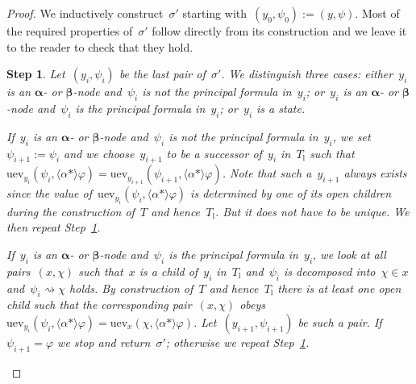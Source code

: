 \documentclass{entcs}
\newtheorem{stp}{Step}
\newenvironment{step}{\vspace{-\lastskip}\par \addvspace{.6pc
    plus .2pc minus .1pc}\begin{stp}\rm}{\end{stp}\par\addvspace{.6pc
    plus .2pc minus .1pc}}
\newcommand{\pea}[2]{\langle#1\rangle #2}
\newcommand{\prp}[1]{#1*}
\newcommand{\pzz}{\mathrel{\rightsquigarrow}}
\newcommand{\tuev}{\mathrm{uev}}
\newcommand{\talpha}{\boldsymbol{\alpha}}
\newcommand{\tbeta}{\boldsymbol{\beta}}
\newcommand{\tl}{T_{\mathrm{l}}}
\newcommand{\fchn}{\sigma}
\begin{document}
\begin{proof}
  We inductively construct~$\fchn'$ starting with~$(y_0, \psi_0) := (y, \psi)$.
  Most of the required properties of~$\fchn'$ follow directly from its construction
  and we leave it to the reader to check that they hold.
  \begin{step}
    \label{step_one}
    Let~$(y_i, \psi_i)$ be the last pair of~$\fchn'$.
    We distinguish three cases: either~$y_i$ is an $\talpha$- or $\tbeta$-node
    and~$\psi_i$ is not the principal formula in~$y_i$;
    or~$y_i$ is an $\talpha$- or $\tbeta$-node
    and~$\psi_i$ is the principal formula in~$y_i$;
    or~$y_i$ is a state.

    If~$y_i$ is an $\talpha$- or $\tbeta$-node
    and~$\psi_i$ is not the principal formula in~$y_i$,
    we set~$\psi_{i+1} := \psi_i$ and we choose~$y_{i+1}$ to be a successor of~$y_i$ in~$\tl$
    such that $\tuev_{y_i}(\psi_i, \pea{\prp{\alpha}}{\varphi}) = \tuev_{y_{i+1}}(\psi_{i+1}, \pea{\prp{\alpha}}{\varphi})$.
    Note that such a~$y_{i+1}$ always exists
    since the value of~$\tuev_{y_i}(\psi_i, \pea{\prp{\alpha}}{\varphi})$
    is determined by one of its open children during the construction of~$T$ and hence~$\tl$.
    But it does not have to be unique.
    We then repeat Step~\ref{step_one}.

    If~$y_i$ is an $\talpha$- or $\tbeta$-node
    and~$\psi_i$ is the principal formula in~$y_i$,
    we look at all pairs~$(x, \chi)$
    such that~$x$ is a child of~$y_i$ in~$\tl$
    and~$\psi_i$ is decomposed into~$\chi \in x$
    and~$\psi_i \pzz \chi$ holds.
    By construction of~$T$ and hence~$\tl$ there is at least one open child
    such that the corresponding pair~$(x, \chi)$
    obeys~$\tuev_{y_i}(\psi_i, \pea{\prp{\alpha}}{\varphi}) = \tuev_x(\chi, \pea{\prp{\alpha}}{\varphi})$.
    Let~$(y_{i+1}, \psi_{i+1})$ be such a pair.
    If~$\psi_{i+1} = \varphi$ we stop and return~$\fchn'$;
    otherwise we repeat Step~\ref{step_one}.


\end{step}
\end{proof}
\end{document}
